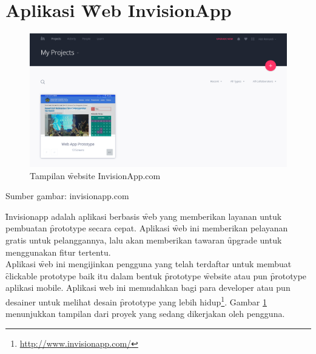 \section{Aplikasi \f{Web} InvisionApp}\label{subsec:invisionapp}
\begin{figure}
	\centering
	\includegraphics[width=\textwidth]
	{pics/invisionapp.PNG}
	\caption{Tampilan \f{website} InvisionApp.com}
	\label{fig:pajakindiaweb} 	
\end{figure}
\begin{center}
	{\small Sumber gambar: invisionapp.com}
\end{center}
\f{Invisionapp} adalah aplikasi berbasis \f{web} yang memberikan layanan untuk pembuatan \f{prototype} secara cepat. Aplikasi \f{web} ini memberikan pelayanan gratis untuk pelanggannya, lalu akan memberikan tawaran \f{upgrade} untuk menggunakan fitur tertentu.
\newline\\
Aplikasi \f{web} ini mengijinkan pengguna yang telah terdaftar untuk membuat \f{clickable prototype} baik itu dalam bentuk \f{prototype} \f{website} atau pun \f{prototype} aplikasi mobile. Aplikasi web ini memudahkan bagi para developer atau pun desainer untuk melihat desain \f{prototype} yang lebih hidup\footnote{\url{http://www.invisionapp.com/}}.
Gambar \ref{subsec:invisionapp} menunjukkan tampilan dari proyek yang sedang dikerjakan oleh pengguna.
